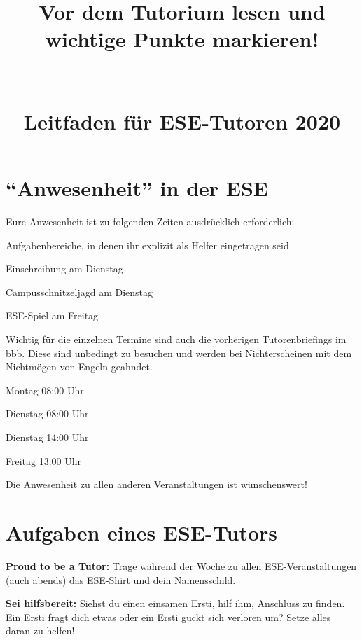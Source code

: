 \documentclass[a4paper,12pt]{scrreprt}
\begin{document}
\title{\huge{\textbf{Vor dem Tutorium lesen und wichtige Punkte markieren!}}\\\ \\\ \\{Leitfaden für ESE-Tutoren 2020}}


\date{}

\author{}
\maketitle

\section*{\enquote{Anwesenheit} in der ESE}
Eure Anwesenheit ist zu folgenden Zeiten ausdrücklich erforderlich:
\begin{itemize*}
    \item Aufgabenbereiche, in denen ihr explizit als Helfer eingetragen seid
    \item Einschreibung am Dienstag
    \item Campusschnitzeljagd am Dienstag
    \item ESE-Spiel am Freitag
\end{itemize*}
Wichtig für die einzelnen Termine sind auch die vorherigen Tutorenbriefings im bbb. Diese sind unbedingt zu besuchen und werden bei Nichterscheinen mit dem Nichtmögen von Engeln geahndet.\\
\begin{itemize*}
    \item Montag        08:00 Uhr
    \item Dienstag      08:00 Uhr
    \item Dienstag 	14:00 Uhr
    \item Freitag       13:00 Uhr
\end{itemize*}

Die Anwesenheit zu allen anderen Veranstaltungen ist wünschenswert!

\section*{Aufgaben eines ESE-Tutors}

\begin{itemize*}
    \item \textbf{Proud to be a Tutor:} Trage während der Woche zu allen ESE-Veranstaltungen (auch abends) das ESE-Shirt und dein Namensschild.
    \item \textbf{Sei hilfsbereit:} Siehst du einen einsamen Ersti, hilf ihm, Anschluss zu finden. Ein Ersti fragt dich etwas oder ein Ersti guckt sich verloren um? Setze alles daran zu helfen!
\end{itemize*}
\end{document}
